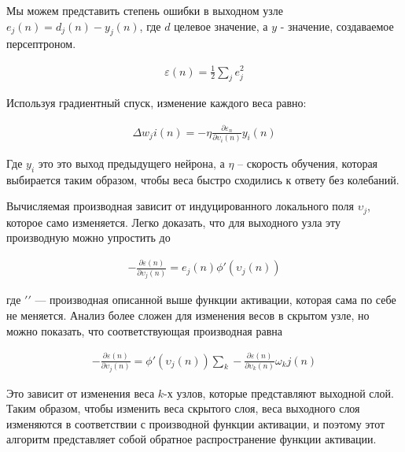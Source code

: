 Мы можем представить степень ошибки в выходном узле $e_j(n) = d_j(n) - y_j(n)$, где $d$
целевое значение, а $y$ - значение, создаваемое персептроном.

\begin{equation}
  \begin{gathered}
    \varepsilon (n) = \frac{1}{2} \sum_j e_j^2
  \end{gathered}
  \label{eq:speach_formula_16}
\end{equation}

Используя градиентный спуск, изменение каждого веса равно:

\begin{equation}
  \begin{gathered}
    \Delta w_ji(n) = -\eta \frac{\partial \varepsilon_n}{\partial \upsilon_i (n)} y_i(n)
  \end{gathered}
  \label{eq:speach_formula_17}
\end{equation}

Где $y_i$ это это выход предыдущего нейрона, а $\eta$ – скорость обучения, 
которая выбирается таким образом, чтобы веса быстро сходились к ответу без колебаний.

Вычисляемая производная зависит от индуцированного локального поля $\upsilon_j$,
которое само изменяется. Легко доказать, что для выходного узла эту производную можно упростить до

\begin{equation}
  \begin{gathered}
    - \frac{\partial \varepsilon (n)}{\partial \upsilon_j (n)} = e_j(n) {\phi}'(\upsilon_j(n))
  \end{gathered}
  \label{eq:speach_formula_18}
\end{equation}

где ${\prime}'$ — производная описанной выше функции активации, которая сама по 
себе не меняется. Анализ более сложен для изменения весов в скрытом узле, 
но можно показать, что соответствующая производная равна

\begin{equation}
  \begin{gathered}
    - \frac{\partial \varepsilon (n)}{\partial \upsilon_j (n)} = {\phi}'(\upsilon_j(n)) \sum_k - \frac{\partial \varepsilon(n)}{\partial \upsilon_k(n)} \omega_kj(n)
  \end{gathered}
  \label{eq:speach_formula_19}
\end{equation}

Это зависит от изменения веса $k$-х узлов, которые представляют выходной слой. 
Таким образом, чтобы изменить веса скрытого слоя, веса выходного слоя изменяются 
в соответствии с производной функции активации, и поэтому этот алгоритм представляет собой обратное распространение функции активации.



